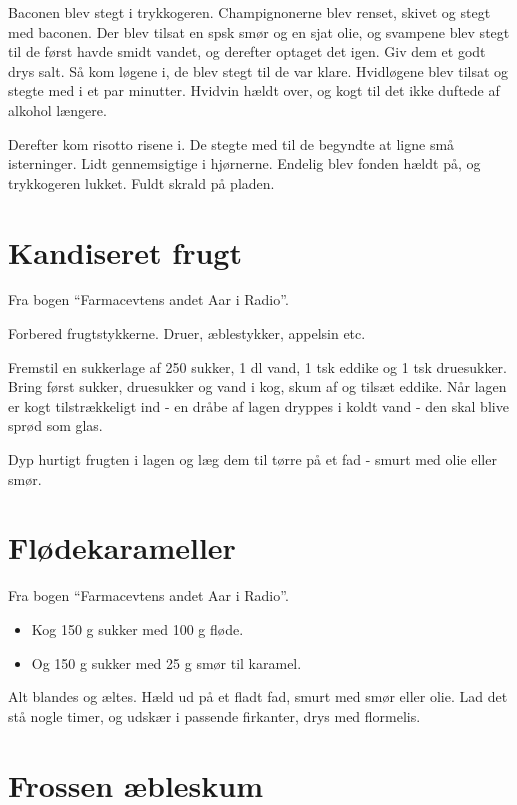 \documentclass[
]{book}
\begin{document}
Baconen blev stegt i trykkogeren. Champignonerne blev renset, skivet og stegt med baconen. Der blev tilsat en spsk smør og en sjat olie, og svampene blev stegt til de først havde smidt vandet, og derefter optaget det igen. Giv dem et godt drys salt. Så kom løgene i, de blev stegt til de var klare. Hvidløgene blev tilsat og stegte med i et par minutter. Hvidvin hældt over, og kogt til det ikke duftede af alkohol længere.

Derefter kom risotto risene i. De stegte med til de begyndte at ligne små isterninger. Lidt gennemsigtige i hjørnerne. Endelig blev fonden hældt på, og trykkogeren lukket. Fuldt skrald på pladen.

\hypertarget{kandiseret-frugt}{%
\section{Kandiseret frugt}\label{kandiseret-frugt}}

Fra bogen ``Farmacevtens andet Aar i Radio''.

Forbered frugtstykkerne. Druer, æblestykker, appelsin etc.

Fremstil en sukkerlage af 250 sukker, 1 dl vand, 1 tsk eddike og 1 tsk druesukker. Bring først sukker, druesukker og vand i kog, skum af og tilsæt eddike. Når lagen er kogt tilstrækkeligt ind - en dråbe af lagen dryppes i koldt vand - den skal blive sprød som glas.

Dyp hurtigt frugten i lagen og læg dem til tørre på et fad - smurt med olie eller smør.

\hypertarget{fluxf8dekarameller}{%
\section{Flødekarameller}\label{fluxf8dekarameller}}

Fra bogen ``Farmacevtens andet Aar i Radio''.

\begin{itemize}
\item
  Kog 150 g sukker med 100 g fløde.
\item
  Og 150 g sukker med 25 g smør til karamel.
\end{itemize}

Alt blandes og æltes. Hæld ud på et fladt fad, smurt med smør eller olie. Lad det stå nogle timer, og udskær i passende firkanter, drys med flormelis.

\hypertarget{frossen-uxe6bleskum}{%
\section{Frossen æbleskum}\label{frossen-uxe6bleskum}}
\end{document}
